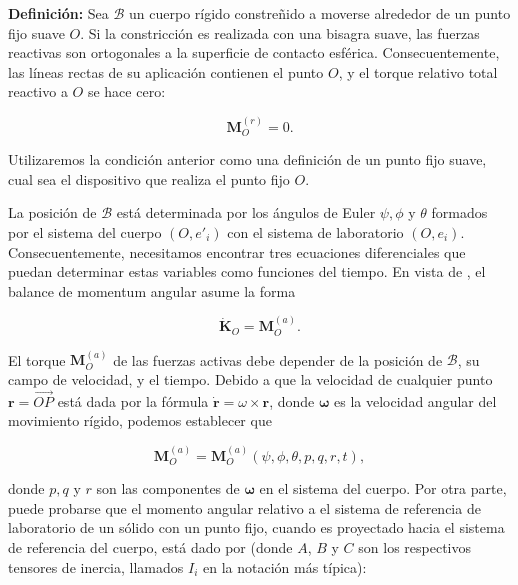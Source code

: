 \documentclass[a4paper,10pt]{article}
\numberwithin{equation}{section}
\newcommand{\definicion}{\textbf{Definición: }}
\begin{document}
\vspace{.3cm}

\definicion Sea $\mathcal{B}$ un cuerpo rígido constreñido a moverse alrededor de un punto fijo suave $O$. Si 
la constricción es realizada con una bisagra suave, las fuerzas reactivas son ortogonales 
a la superficie de contacto esférica. Consecuentemente, las líneas rectas de su aplicación
contienen el punto $O$, y el torque relativo total reactivo a $O$ se hace cero:

\begin{equation}
 \mathbf{M}_O^{(r)} = 0.
 \label{eq:poinsot1}
\end{equation}

Utilizaremos la condición anterior como una definición de un punto fijo suave, cual sea 
el dispositivo que realiza el punto fijo $O$.

\vspace{.3cm}

La posición de $\mathcal{B}$ está determinada por los ángulos de Euler $\psi,\phi$ y $\theta$ formados 
por el sistema del cuerpo $(O,e'_i)$ con el sistema de laboratorio $(O,e_i)$. Consecuentemente,
necesitamos encontrar tres ecuaciones diferenciales que puedan determinar estas variables 
como funciones del tiempo. En vista de , el balance de momentum 
angular asume la forma

\begin{equation}
 \mathbf{\dot{K}}_O =  \mathbf{M}_O^{(a)}.
 \label{eq:poinsot2}
\end{equation}

El torque $\mathbf{M}_O^{(a)}$ de las fuerzas activas debe depender de la posición de 
$\mathcal{B}$, su campo de velocidad, y el tiempo.  Debido a que la velocidad de cualquier punto
$\mathbf{r} = \overrightarrow{OP}$ está dada por la fórmula $\mathbf{\dot{r}}= \omega 
\times \mathbf{r}$, donde $\mathbf{\omega}$ es la velocidad angular del movimiento 
rígido, podemos establecer que 

\begin{equation}
 \mathbf{M}_O^{(a)} = \mathbf{M}_O^{(a)}(\psi,\phi,\theta,p,q,r,t),
 \label{eq:poinsot3}
\end{equation}

donde $p,q$ y $r$ son las componentes de $\mathbf{\omega}$ en el sistema del cuerpo. Por
otra parte, puede probarse que el momento angular relativo a el sistema de referencia de 
laboratorio de un sólido con un punto fijo, cuando es proyectado hacia el sistema 
de referencia del cuerpo, está dado por (donde $A$, $B$ y $C$ son los respectivos 
tensores de inercia, llamados $I_i$ en la notación más típica):
\end{document}
